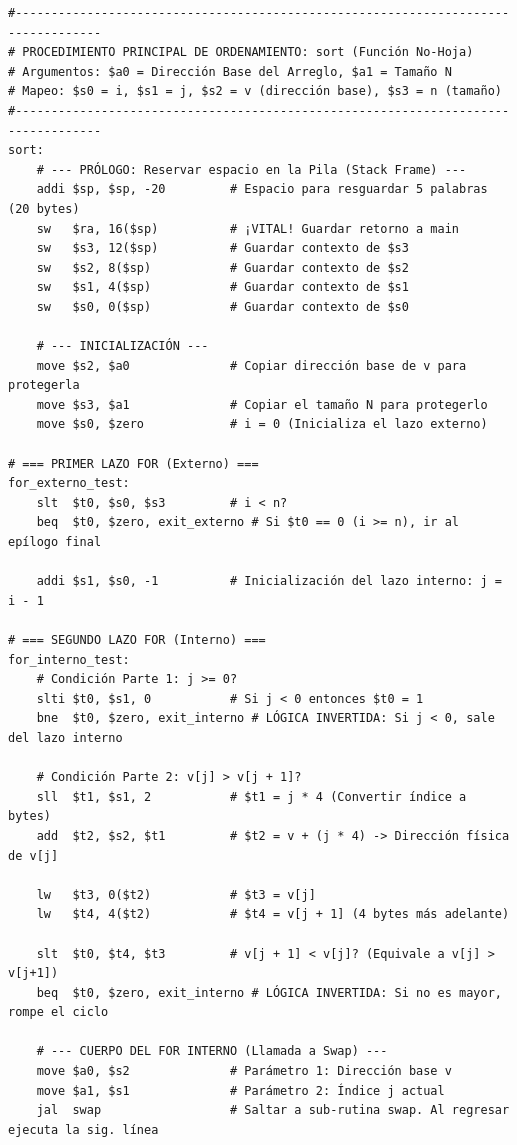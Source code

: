 \documentclass[11pt,letterpaper]{article}
\begin{document}
\begin{lstlisting}[caption={Código máquina MIPS completo para la rutina sort y sub-rutina swap.}]
#----------------------------------------------------------------------------------
# PROCEDIMIENTO PRINCIPAL DE ORDENAMIENTO: sort (Función No-Hoja)
# Argumentos: $a0 = Dirección Base del Arreglo, $a1 = Tamaño N
# Mapeo: $s0 = i, $s1 = j, $s2 = v (dirección base), $s3 = n (tamaño)
#----------------------------------------------------------------------------------
sort:
    # --- PRÓLOGO: Reservar espacio en la Pila (Stack Frame) ---
    addi $sp, $sp, -20         # Espacio para resguardar 5 palabras (20 bytes)
    sw   $ra, 16($sp)          # ¡VITAL! Guardar retorno a main
    sw   $s3, 12($sp)          # Guardar contexto de $s3
    sw   $s2, 8($sp)           # Guardar contexto de $s2
    sw   $s1, 4($sp)           # Guardar contexto de $s1
    sw   $s0, 0($sp)           # Guardar contexto de $s0

    # --- INICIALIZACIÓN ---
    move $s2, $a0              # Copiar dirección base de v para protegerla
    move $s3, $a1              # Copiar el tamaño N para protegerlo
    move $s0, $zero            # i = 0 (Inicializa el lazo externo)

# === PRIMER LAZO FOR (Externo) ===
for_externo_test:
    slt  $t0, $s0, $s3         # i < n?
    beq  $t0, $zero, exit_externo # Si $t0 == 0 (i >= n), ir al epílogo final
    
    addi $s1, $s0, -1          # Inicialización del lazo interno: j = i - 1

# === SEGUNDO LAZO FOR (Interno) ===
for_interno_test:
    # Condición Parte 1: j >= 0?
    slti $t0, $s1, 0           # Si j < 0 entonces $t0 = 1
    bne  $t0, $zero, exit_interno # LÓGICA INVERTIDA: Si j < 0, sale del lazo interno
    
    # Condición Parte 2: v[j] > v[j + 1]?
    sll  $t1, $s1, 2           # $t1 = j * 4 (Convertir índice a bytes)
    add  $t2, $s2, $t1         # $t2 = v + (j * 4) -> Dirección física de v[j]
    
    lw   $t3, 0($t2)           # $t3 = v[j]
    lw   $t4, 4($t2)           # $t4 = v[j + 1] (4 bytes más adelante)
    
    slt  $t0, $t4, $t3         # v[j + 1] < v[j]? (Equivale a v[j] > v[j+1])
    beq  $t0, $zero, exit_interno # LÓGICA INVERTIDA: Si no es mayor, rompe el ciclo

    # --- CUERPO DEL FOR INTERNO (Llamada a Swap) ---
    move $a0, $s2              # Parámetro 1: Dirección base v
    move $a1, $s1              # Parámetro 2: Índice j actual
    jal  swap                  # Saltar a sub-rutina swap. Al regresar ejecuta la sig. línea
    

\end{lstlisting}
\end{document}
